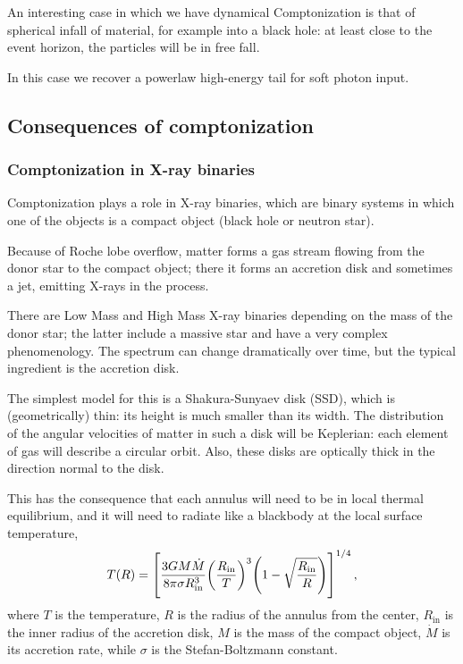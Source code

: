 \documentclass[main.tex]{subfiles}
\begin{document}

An interesting case in which we have dynamical Comptonization is that of spherical infall of material, for example into a black hole: at least close to the event horizon, the particles will be in free fall. 

In this case we recover a powerlaw high-energy tail for soft photon input.

\subsection{Consequences of comptonization}

\subsubsection{Comptonization in X-ray binaries}

Comptonization plays a role in X-ray binaries, which are binary systems in which one of the objects is a compact object (black hole or neutron star).

Because of Roche lobe overflow, matter forms a gas stream flowing from the donor star to the compact object; there it forms an accretion disk and sometimes a jet, emitting X-rays in the process.

There are Low Mass and High Mass X-ray binaries depending on the mass of the donor star; the latter include a massive star and have a very complex phenomenology. 
The spectrum can change dramatically over time, but the typical ingredient is the accretion disk. 

The simplest model for this is a Shakura-Sunyaev disk (SSD), which is (geometrically) thin: its height is much smaller than its width.
The distribution of the angular velocities of matter in such a disk will be Keplerian: each element of gas will describe a circular orbit. 
Also, these disks are optically thick in the direction normal to the disk. 

This has the consequence that each annulus will need to be in local thermal equilibrium, and it will need to radiate like a blackbody at the local surface temperature, 
%
\begin{align}
T(R) = \qty[\frac{3 GM \dot{M}}{8 \pi \sigma R _{\text{in}}^3 } \qty( \frac{R _{\text{in}}}{T})^{3} \qty(1 - \sqrt{\frac{R _{\text{in}}}{R}})]^{1/4}
\,,
\end{align}
%
where \(T\) is the temperature, \(R\) is the radius of the annulus from the center, \(R _{\text{in}}\) is the inner radius of the accretion disk, \(M\) is the mass of the compact object, \(\dot{M}\) is its accretion rate, while \(\sigma \) is the Stefan-Boltzmann constant. 
\end{document}
